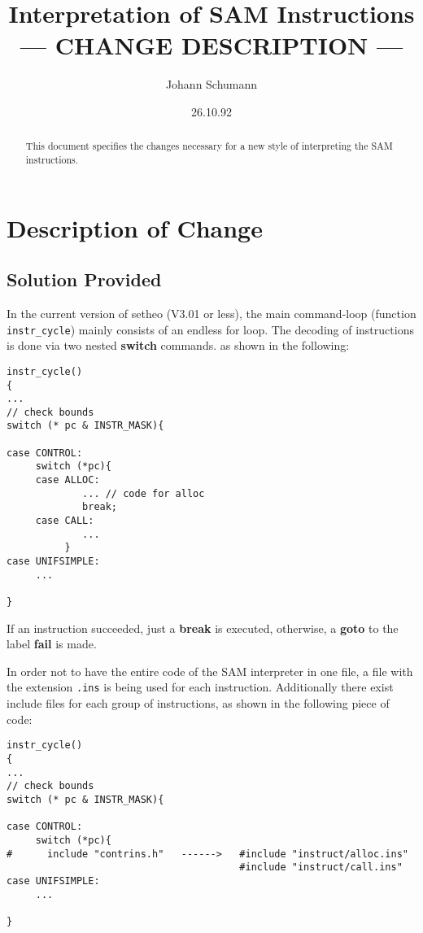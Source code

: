 

\title{Interpretation of SAM Instructions\\
--- CHANGE DESCRIPTION ---}
\author{Johann Schumann}
\date{26.10.92}



\maketitle

\begin{abstract}
This document specifies the changes necessary for a new style
of interpreting the SAM instructions.

\end{abstract}

\section{Description of Change}

\subsection{Solution Provided}

In the current version of setheo (V3.01 or less), the main command-loop
(function {\tt instr\_cycle}) mainly consists of an endless for loop.
The decoding of instructions is done via two nested {\bf switch} commands.
as shown in the following:

\begin{verbatim}
instr_cycle()
{
...
// check bounds
switch (* pc & INSTR_MASK){

case CONTROL:
     switch (*pc){
     case ALLOC:
             ... // code for alloc
             break;
     case CALL:
             ...
          }
case UNIFSIMPLE:
     ...

}
\end{verbatim}

If an instruction succeeded, just a {\bf break} is executed, otherwise,
a {\bf goto} to the label {\bf fail} is made.

In order not to have the entire code of the SAM interpreter in one file,
a file with the extension {\tt .ins} is being used for each instruction.
Additionally there exist include files for each group of instructions,
as shown in the following piece of code:

\begin{verbatim}
instr_cycle()
{
...
// check bounds
switch (* pc & INSTR_MASK){

case CONTROL:
     switch (*pc){
#      include "contrins.h"   ------>   #include "instruct/alloc.ins"
                                        #include "instruct/call.ins"
case UNIFSIMPLE:
     ...

}
\end{verbatim}

